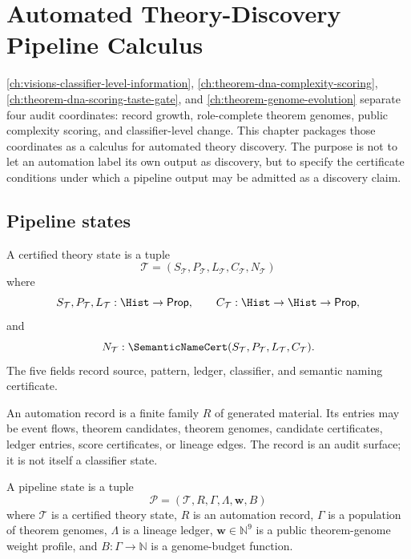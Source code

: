 \chapter{Automated Theory-Discovery Pipeline Calculus}
\label{ch:automated-theory-discovery-pipeline-calculus}

\autoref{ch:visions-classifier-level-information},
\autoref{ch:theorem-dna-complexity-scoring},
\autoref{ch:theorem-dna-scoring-taste-gate}, and
\autoref{ch:theorem-genome-evolution} separate four audit coordinates:
record growth, role-complete theorem genomes, public complexity scoring, and
classifier-level change. This chapter packages those coordinates as a calculus
for automated theory discovery. The purpose is not to let an automation label
its own output as discovery, but to specify the certificate conditions under
which a pipeline output may be admitted as a discovery claim.

\section{Pipeline states}
\label{sec:automated-discovery-pipeline-states}

\begin{definition}
\label{def:automated-discovery-certified-theory-state}
A certified theory state is a tuple
$$
\mathcal T=(S_{\mathcal T},P_{\mathcal T},L_{\mathcal T},
C_{\mathcal T},N_{\mathcal T})
$$
where
$$
S_{\mathcal T},P_{\mathcal T},L_{\mathcal T}:\Hist\to\mathsf{Prop},
\qquad
C_{\mathcal T}:\Hist\to\Hist\to\mathsf{Prop},
$$
and
$$
N_{\mathcal T}:
\SemanticNameCert(S_{\mathcal T},P_{\mathcal T},
L_{\mathcal T},C_{\mathcal T}).
$$
The five fields record source, pattern, ledger, classifier, and semantic
naming certificate.
\end{definition}

\begin{definition}
\label{def:automated-discovery-automation-record}
An automation record is a finite family $R$ of generated material. Its entries
may be event flows, theorem candidates, theorem genomes, candidate
certificates, ledger entries, score certificates, or lineage edges. The record
is an audit surface; it is not itself a classifier state.
\end{definition}

\begin{definition}
\label{def:automated-discovery-pipeline-state}
A pipeline state is a tuple
$$
\mathcal P=(\mathcal T,R,\Gamma,\Lambda,\mathbf w,B)
$$
where $\mathcal T$ is a certified theory state, $R$ is an automation record,
$\Gamma$ is a population of theorem genomes, $\Lambda$ is a lineage ledger,
$\mathbf w\in\mathbb N^9$ is a public theorem-genome weight profile, and
$B:\Gamma\to\mathbb N$ is a genome-budget function.
\end{definition}

